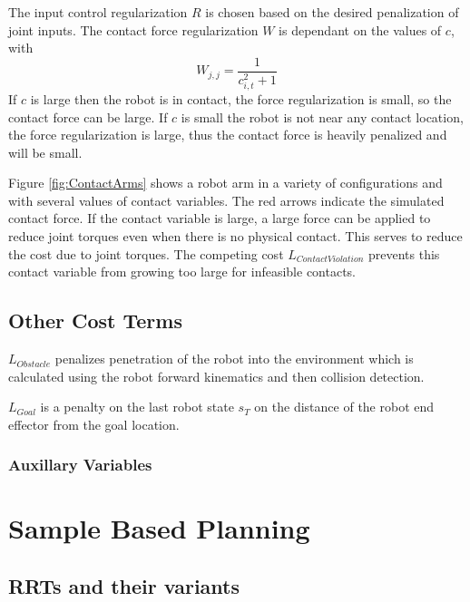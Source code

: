 \documentclass[../thesis.tex]{subfiles}
\begin{document}
The input control regularization $R$ is chosen based on the desired penalization of joint inputs. The contact force regularization $W$ is dependant on the values of $c$, with 
$$W_{j,j} = \frac{1}{c_{i,t}^2 + 1}$$
If $c$ is large then the robot is in contact, the force regularization is small, so the contact force can be large. If $c$ is small the robot is not near any contact location, the force regularization is large, thus the contact force is heavily penalized and will be small.

Figure \ref{fig:ContactArms} shows a robot arm in a variety of configurations and with several values of contact variables.
The red arrows indicate the simulated contact force.
If the contact variable is large, a large force can be applied to reduce joint torques even when there is no physical contact.
This serves to reduce the cost due to joint torques.
The competing cost $L_{Contact Violation}$ prevents this contact variable from growing too large for infeasible contacts.




\subsection{Other Cost Terms}
$L_{Obstacle}$ penalizes penetration of the robot into the environment which is calculated using the robot forward kinematics and then collision detection.

$L_{Goal}$ is a penalty on the last robot state $s_T$ on the distance of the robot end effector from the goal location.

\subsubsection{Auxillary Variables}



\section{Sample Based Planning}
\subsection{RRTs and their variants}
\end{document}
